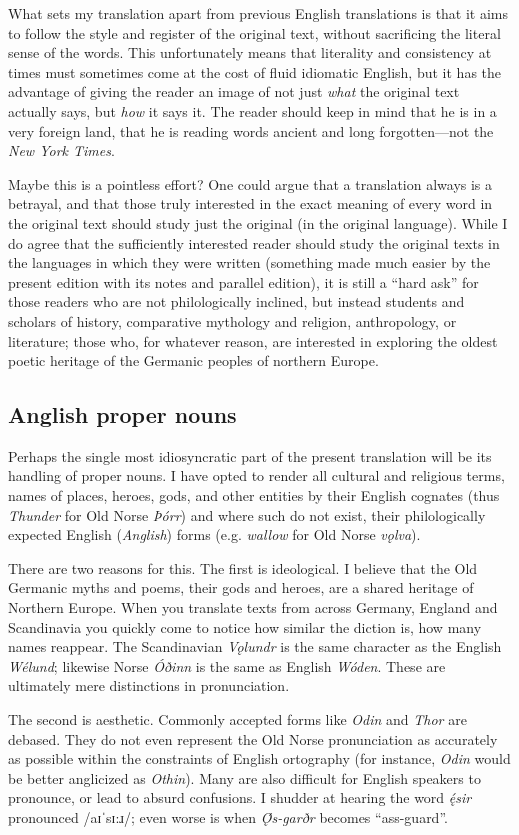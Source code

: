     What sets my translation apart from previous English translations is that it aims to follow the style and register of the original text, without sacrificing the literal sense of the words.  This unfortunately means that literality and consistency at times must sometimes come at the cost of fluid idiomatic English, but it has the advantage of giving the reader an image of not just \emph{what} the original text actually says, but \emph{how} it says it.  The reader should keep in mind that he is in a very foreign land, that he is reading words ancient and long forgotten—not the \emph{New York Times}.

    Maybe this is a pointless effort? One could argue that a translation always is a betrayal, and that those truly interested in the exact meaning of every word in the original text should study just the original (in the original language).  While I do agree that the sufficiently interested reader should study the original texts in the languages in which they were written (something made much easier by the present edition with its notes and parallel edition), it is still a “hard ask” for those readers who are not philologically inclined, but instead students and scholars of history, comparative mythology and religion, anthropology, or literature; those who, for whatever reason, are interested in exploring the oldest poetic heritage of the Germanic peoples of northern Europe.

    \subsection{Anglish proper nouns}
      Perhaps the single most idiosyncratic part of the present translation will be its handling of proper nouns. I have opted to render all cultural and religious terms, names of places, heroes, gods, and other entities by their English cognates (thus \emph{Thunder} for Old Norse \emph{Þórr}) and where such do not exist, their philologically expected English (\emph{Anglish}) forms (e.g. \emph{wallow} for Old Norse \emph{vǫlva}).

      There are two reasons for this.  The first is ideological.  I believe that the Old Germanic myths and poems, their gods and heroes, are a shared heritage of Northern Europe.  When you translate texts from across Germany, England and Scandinavia you quickly come to notice how similar the diction is, how many names reappear. The Scandinavian \emph{Vǫlundr} is the same character as the English \emph{Wélund}; likewise Norse \emph{Óðinn} is the same as English \emph{Wóden}.  These are ultimately mere distinctions in pronunciation.

      The second is aesthetic.  Commonly accepted forms like \emph{Odin} and \emph{Thor} are debased.  They do not even represent the Old Norse pronunciation as accurately as possible within the constraints of English ortography (for instance, \emph{Odin} would be better anglicized as \emph{Othin}).  Many are also difficult for English speakers to pronounce, or lead to absurd confusions.  I shudder at hearing the word \emph{ę́sir} pronounced /aɪˈsɪ:ɹ/; even worse is when \emph{Ǫ́s-garðr} becomes “ass-guard”.

  \printbibliography%

